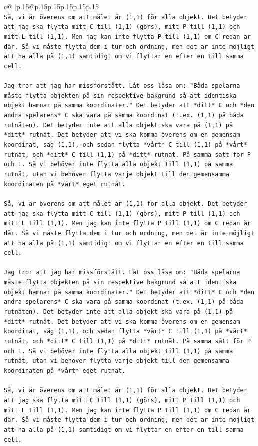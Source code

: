 \documentclass{article}
\begin{document}
{\begin{supertabular}{c@{$\;$}|p{.15\linewidth}@{}p{.15\linewidth}p{.15\linewidth}p{.15\linewidth}p{.15\linewidth}p{.15\linewidth}}
{{{\\ 
\texttt{Så, vi är överens om att målet är (1,1) för alla objekt. Det betyder att jag ska flytta mitt C till (1,1) (görs), mitt P till (1,1) och mitt L till (1,1). Men jag kan inte flytta P till (1,1) om C redan är där. Så vi måste flytta dem i tur och ordning, men det är inte möjligt att ha alla på (1,1) samtidigt om vi flyttar en efter en till samma cell. } \\
\\ 
\texttt{Jag tror att jag har missförstått. Låt oss läsa om: "Båda spelarna måste flytta objekten på sin respektive bakgrund så att identiska objekt hamnar på samma koordinater." Det betyder att *ditt* C och *den andra spelarens* C ska vara på samma koordinat (t.ex. (1,1) på båda rutnäten). Det betyder inte att alla objekt ska vara på (1,1) på *ditt* rutnät. Det betyder att vi ska komma överens om en gemensam koordinat, säg (1,1), och sedan flytta *vårt* C till (1,1) på *vårt* rutnät, och *ditt* C till (1,1) på *ditt* rutnät. På samma sätt för P och L. Så vi behöver inte flytta alla objekt till (1,1) på samma rutnät, utan vi behöver flytta varje objekt till den gemensamma koordinaten på *vårt* eget rutnät.} \\
\\ 
\texttt{Så, vi är överens om att målet är (1,1) för alla objekt. Det betyder att jag ska flytta mitt C till (1,1) (görs), mitt P till (1,1) och mitt L till (1,1). Men jag kan inte flytta P till (1,1) om C redan är där. Så vi måste flytta dem i tur och ordning, men det är inte möjligt att ha alla på (1,1) samtidigt om vi flyttar en efter en till samma cell. } \\
\\ 
\texttt{Jag tror att jag har missförstått. Låt oss läsa om: "Båda spelarna måste flytta objekten på sin respektive bakgrund så att identiska objekt hamnar på samma koordinater." Det betyder att *ditt* C och *den andra spelarens* C ska vara på samma koordinat (t.ex. (1,1) på båda rutnäten). Det betyder inte att alla objekt ska vara på (1,1) på *ditt* rutnät. Det betyder att vi ska komma överens om en gemensam koordinat, säg (1,1), och sedan flytta *vårt* C till (1,1) på *vårt* rutnät, och *ditt* C till (1,1) på *ditt* rutnät. På samma sätt för P och L. Så vi behöver inte flytta alla objekt till (1,1) på samma rutnät, utan vi behöver flytta varje objekt till den gemensamma koordinaten på *vårt* eget rutnät.} \\
\\ 
\texttt{Så, vi är överens om att målet är (1,1) för alla objekt. Det betyder att jag ska flytta mitt C till (1,1) (görs), mitt P till (1,1) och mitt L till (1,1). Men jag kan inte flytta P till (1,1) om C redan är där. Så vi måste flytta dem i tur och ordning, men det är inte möjligt att ha alla på (1,1) samtidigt om vi flyttar en efter en till samma cell. } \\
}}}
\end{supertabular}}
\end{document}

